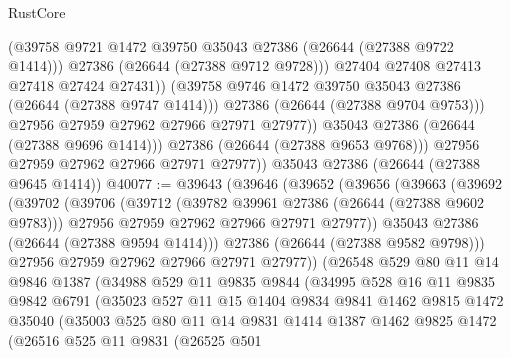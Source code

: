 \begin{lexlean}{RustCore}
\begin{coremodule}
                        (@39758 @9721 @1472 @39750 @35043 @27386 (@26644 (@27388 @9722 @1414)))
                        @27386
                        (@26644 (@27388 @9712 @9728)))
                      @27404
                      @27408
                      @27413
                      @27418
                      @27424
                      @27431))
                  (@39758 @9746 @1472 @39750 @35043 @27386 (@26644 (@27388 @9747 @1414)))
                  @27386
                  (@26644 (@27388 @9704 @9753)))
                @27956
                @27959
                @27962
                @27966
                @27971
                @27977))
            @35043
            @27386
            (@26644 (@27388 @9696 @1414)))
          @27386
          (@26644 (@27388 @9653 @9768)))
        @27956
        @27959
        @27962
        @27966
        @27971
        @27977))
    @35043
    @27386
    (@26644 (@27388 @9645 @1414))
@40077 := @39643
    (@39646
      (@39652
        (@39656
          (@39663
            (@39692
              (@39702
                (@39706
                  (@39712
                    (@39782 @39961 @27386 (@26644 (@27388 @9602 @9783)))
                    @27956
                    @27959
                    @27962
                    @27966
                    @27971
                    @27977))
                @35043
                @27386
                (@26644 (@27388 @9594 @1414)))
              @27386
              (@26644 (@27388 @9582 @9798)))
            @27956
            @27959
            @27962
            @27966
            @27971
            @27977))
        (@26548
          @529
          @80
          @11
          @14
          @9846
          @1387
          (@34988
            @529
            @11
            @9835
            @9844
            (@34995
              @528
              @16
              @11
              @9835
              @9842
              @6791
              (@35023
                @527
                @11
                @15
                @1404
                @9834
                @9841
                @1462
                @9815
                @1472
                @35040
                (@35003
                  @525
                  @80
                  @11
                  @14
                  @9831
                  @1414
                  @1387
                  @1462
                  @9825
                  @1472
                  (@26516
                    @525
                    @11
                    @9831
                    (@26525
                      @501

\end{coremodule}
\end{lexlean}
